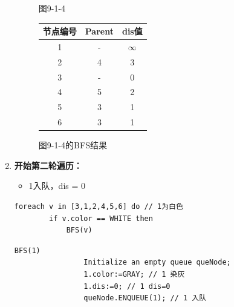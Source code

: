 \documentclass{article}
\begin{document}
\begin{enumerate}
\begin{figure}[htbp]
\begin{minipage}[b]{0.6\textwidth}
        \caption{图9-1-4}
        \label{fig:9-1-4}
    \end{minipage}%
    \hfill%
    \begin{minipage}[b]{0.4\textwidth}    %
        \centering
        \begin{tabular}{|c|c|c|}
            \hline
            节点编号 & Parent & dis值 \\
            \hline
            1 & - & $\infty$ \\
            2 & 4 & 3 \\
            3 & - & 0 \\
            4 & 5 & 2 \\
            5 & 3 & 1 \\
            6 & 3 & 1 \\
            \hline
        \end{tabular}
        \caption{图9-1-4的BFS结果}
        \label{tab:graph9-1-4-bfs}
    \end{minipage}
    \end{figure}
    
    \item \textbf{开始第二轮遍历：}

    \begin{itemize}
        \item 1入队，dis = 0
    \end{itemize}

    \begin{lstlisting}[style=algorithmPPT]
    foreach v in [3,1,2,4,5,6] do // 1为白色
        if v.color == WHITE then
            BFS(v)
        \end{lstlisting}

    \begin{lstlisting}[style=algorithmPPT]
            BFS(1)
                Initialize an empty queue queNode;
                1.color:=GRAY; // 1 染灰
                1.dis:=0; // 1 dis=0
                queNode.ENQUEUE(1); // 1 入队
        \end{lstlisting}


\end{enumerate}
\end{document}
